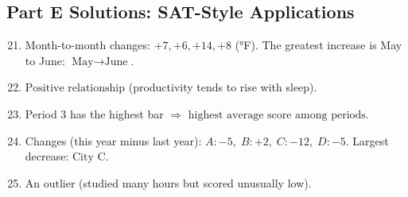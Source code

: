 \documentclass[14pt]{extarticle}
\begin{document}
\subsection*{Part E Solutions: SAT-Style Applications}
\begin{enumerate}
  \setcounter{enumi}{20}
  \item Month-to-month changes: \(+7, +6, +14, +8\) (°F). The greatest increase is May to June: \(\boxed{\text{May} \to \text{June}}\).
  \item \(\boxed{\text{Positive relationship}}\) (productivity tends to rise with sleep).
  \item Period 3 has the highest bar \(\Rightarrow\) \(\boxed{\text{highest average score among periods}}\).
  \item Changes (this year minus last year): \(A: -5,\; B: +2,\; C: -12,\; D: -5\). Largest decrease: \(\boxed{\text{City C}}\).
  \item \(\boxed{\text{An outlier}}\) (studied many hours but scored unusually low).
\end{enumerate}





\end{document}
